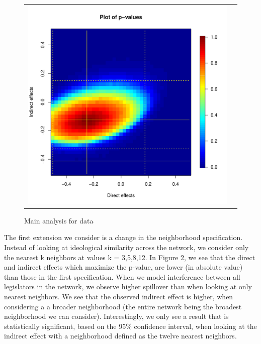 \documentclass[12pt]{article}
\begin{document}
\begin{figure}
	\centering
	\begin{tabular}{cc}
	\includegraphics[scale=0.45]{./images/pval_plot_coppock_replication.pdf}
	\end{tabular}
	\caption{Main analysis for \citet{butler2011can} data}
\end{figure}


The first extension we consider is a change in the neighborhood specification. Instead of looking at ideological similarity across the network,  we consider only the nearest k neighbors at values k = 3,5,8,12.  In Figure 2, we see that the direct and indirect effects which maximize the p-value, are lower (in absolute value) than those in the first specification. When we model interference between all legislators in the network, we observe higher spillover than when looking at only nearest neighbors. We see that the observed indirect effect is higher, when considering a a broader neighborhood (the entire network being the broadest neighborhood we can consider).  Interestingly, we only see a result that is statistically significant, based on the 95\% confidence interval, when looking at the indirect effect with a neighborhood defined as the twelve nearest neighbors.
 
\end{document}
